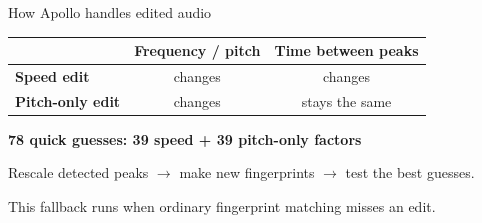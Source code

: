 \documentclass[aspectratio=169,10pt]{beamer}
\begin{document}
\begin{frame}{How Apollo handles edited audio}
  \vspace{4mm}
  \renewcommand{\arraystretch}{1.8}
  \begin{center}
  \begin{tabular}{>{\bfseries}lcc}
    & Frequency / pitch & Time between peaks\\\hline
    Speed edit & changes & changes\\
    Pitch-only edit & changes & stays the same
  \end{tabular}
  \end{center}
  \vspace{5mm}
  {\large\bfseries\color{teal}78 quick guesses: 39 speed + 39 pitch-only factors}
  \vspace{3mm}

  {\large Rescale detected peaks $\rightarrow$ make new fingerprints $\rightarrow$ test the best guesses.}
  \vspace{3mm}

  {\color{soft}This fallback runs when ordinary fingerprint matching misses an edit.}
\end{frame}
\end{document}
